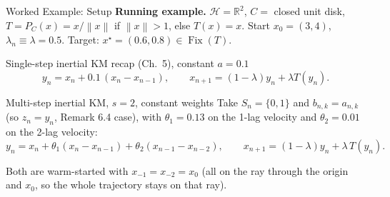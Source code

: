 \documentclass[aspectratio=169,10pt]{beamer}
\newcommand{\R}{\mathbb{R}}
\newcommand{\Hil}{\mathcal{H}}
\newcommand{\norm}[1]{\left\|#1\right\|}
\newcommand{\Fix}{\operatorname{Fix}}
\begin{document}
\begin{frame}{Worked Example: Setup}
\textbf{Running example.} $\Hil=\R^2$, $C=$ closed unit disk,
$T=P_C(x)= x/\norm{x}$ if $\norm x>1$, else $T(x)=x$. Start $x_0=(3,4)$,
$\lambda_n\equiv\lambda=0.5$. Target: $x^\star=(0.6,0.8)\in\Fix(T)$.

\begin{block}{Single-step inertial KM recap (Ch.\ 5), constant $a=0.1$}
\[y_n = x_n + 0.1\,(x_n-x_{n-1}), \qquad x_{n+1}=(1-\lambda)y_n+\lambda T(y_n).\]
\end{block}

\begin{block}{Multi-step inertial KM, $s=2$, constant weights}
Take $S_n=\{0,1\}$ and $b_{n,k}=a_{n,k}$ (so $z_n=y_n$, Remark 6.4 case),
with $\theta_1=0.13$ on the 1-lag velocity and $\theta_2=0.01$ on the
2-lag velocity:
\[
y_n = x_n + \theta_1(x_n-x_{n-1}) + \theta_2(x_{n-1}-x_{n-2}), \qquad
x_{n+1} = (1-\lambda) y_n + \lambda\, T(y_n).
\]
\end{block}
Both are warm-started with $x_{-1}=x_{-2}=x_0$ (all on the ray through the
origin and $x_0$, so the whole trajectory stays on that ray).
\end{frame}
\end{document}
